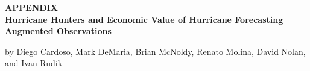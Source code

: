 \documentclass[12pt]{article}%
\begin{document}
\FloatBarrier
\newpage
\begin{singlespace}

{}
\end{singlespace}
\FloatBarrier
\clearpage
\appendix

\thispagestyle{empty}
\begin{center}
\vspace*{\fill}
{\LARGE\bfseries APPENDIX \\ Hurricane Hunters and Economic Value of Hurricane Forecasting Augmented Observations\par}
\vspace{0.7cm}
{\Large by Diego Cardoso, Mark DeMaria, Brian McNoldy, Renato Molina, David Nolan, and Ivan Rudik\par}
\vspace*{\fill}
\end{center}
\clearpage

\setcounter{table}{0}
\renewcommand{\thetable}{\thesection\arabic{table}}
\end{document}

